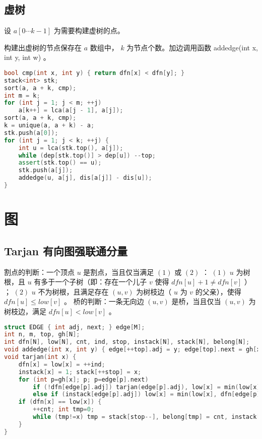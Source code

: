\documentclass{article}
\begin{document}
\subsection{虚树}

设 $a[0 \cdots k - 1]$ 为需要构建虚树的点。

构建出虚树的节点保存在 $a$ 数组中， $k$ 为节点个数。加边调用函数 addedge(int x, int y, int w) 。

\begin{lstlisting}[language=C++]
bool cmp(int x, int y) { return dfn[x] < dfn[y]; }
stack<int> stk;
sort(a, a + k, cmp);
int m = k;
for (int j = 1; j < m; ++j)
	a[k++] = lca(a[j - 1], a[j]);
sort(a, a + k, cmp);
k = unique(a, a + k) - a;
stk.push(a[0]);
for (int j = 1; j < k; ++j) {
	int u = lca(stk.top(), a[j]);
	while (dep[stk.top()] > dep[u]) --top;
	assert(stk.top() == u);
	stk.push(a[j]);
	addedge(u, a[j], dis[a[j]] - dis[u]);
}
\end{lstlisting}

\section{图}

\subsection{Tarjan 有向图强联通分量}
 割点的判断：一个顶点 $u$ 是割点，当且仅当满足 $(1)$ 或 $(2)$ ： $(1)$ $u$ 为树根，且 $u$ 有多于一个子树（即：存在一个儿子 $v$ 使得 $dfn[u] + 1 \neq dfn[v]$ ） ； $(2)$ $u$ 不为树根，且满足存在 $(u, v)$ 为树枝边（ $u$ 为 $v$ 的父亲），使得 $dfn[u] \leq low[v]$ 。
 桥的判断：一条无向边 $(u, v)$ 是桥，当且仅当 $(u, v)$ 为树枝边，满足 $dfn[u] < low[v]$ 。
\begin{lstlisting}[language=C++]
struct EDGE { int adj, next; } edge[M];
int n, m, top, gh[N];
int dfn[N], low[N], cnt, ind, stop, instack[N], stack[N], belong[N];
void addedge(int x, int y) { edge[++top].adj = y; edge[top].next = gh[x]; gh[x] = top; }
void tarjan(int x) {
	dfn[x] = low[x] = ++ind;
	instack[x] = 1; stack[++stop] = x;
	for (int p=gh[x]; p; p=edge[p].next)
		if (!dfn[edge[p].adj]) tarjan(edge[p].adj), low[x] = min(low[x], low[edge[p].adj]);
		else if (instack[edge[p].adj]) low[x] = min(low[x], dfn[edge[p].adj]);
	if (dfn[x] == low[x]) {
		++cnt; int tmp=0;
		while (tmp!=x) tmp = stack[stop--], belong[tmp] = cnt, instack[tmp] = 0;
	}
}
\end{lstlisting}
\end{document}

